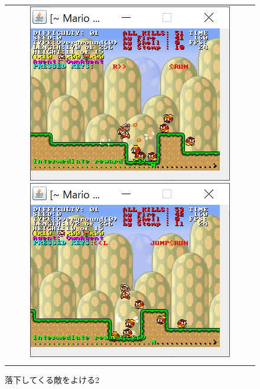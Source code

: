 \documentclass{jsarticle}
\begin{document}
\begin{figure}[H]
	\begin{tabular}{c}
	\begin{minipage}{0.50\hsize}
		\includegraphics{avoid1.png}
		\caption{落下してくる敵をよける1}
	\end{minipage}
	\begin{minipage}{0.50\hsize}
		\includegraphics{avoid2.png}
		\caption{落下してくる敵をよける2}
	\end{minipage}
\\
	\begin{minipage}{0.06\hsize}
       	 \vspace{10mm}
      \end{minipage}
\\


\end{tabular}
\end{figure}
\end{document}
